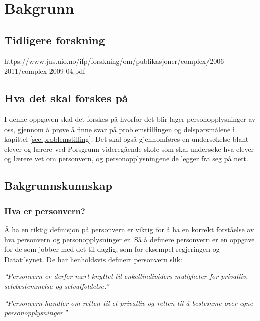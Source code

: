 \section{Bakgrunn}

\subsection{Tidligere forskning}

https://www.jus.uio.no/ifp/forskning/om/publikasjoner/complex/2006-2011/complex-2009-04.pdf

\subsection{Hva det skal forskes på}
I denne oppgaven skal det forskes på hvorfor det blir lager personopplysninger av oss, gjennom å prøve å finne svar på problemstillingen og delspørsmålene i kapittel \ref{sec:problemstilling}. Det skal også gjennomføres en undersøkelse blant elever og lærere ved Porsgrunn videregående skole som skal undersøke hva elever og lærere vet om personvern, og personopplysningene de legger fra seg på nett.

\subsection{Bakgrunnskunnskap}
\subsubsection{Hva er personvern?}
Å ha en riktig definisjon på personvern er viktig for å ha en korrekt forståelse av hva personvern og personopplysninger er. Så å definere personvern er en oppgave for de som jobber med det til daglig, som for eksempel regjeringen og Datatilsynet. De har henholdsvis definert personvern slik:

\textit{``Personvern er derfor nært knyttet til enkeltindividers muligheter for privatliv, selvbestemmelse og selvutfoldelse.''} \parencite{regjeringen_personvern}

\textit{``Personvern handler om retten til et privatliv og retten til å bestemme over egne personopplysninger.''} \parencite{datatilsynet_personvern}

\newpage